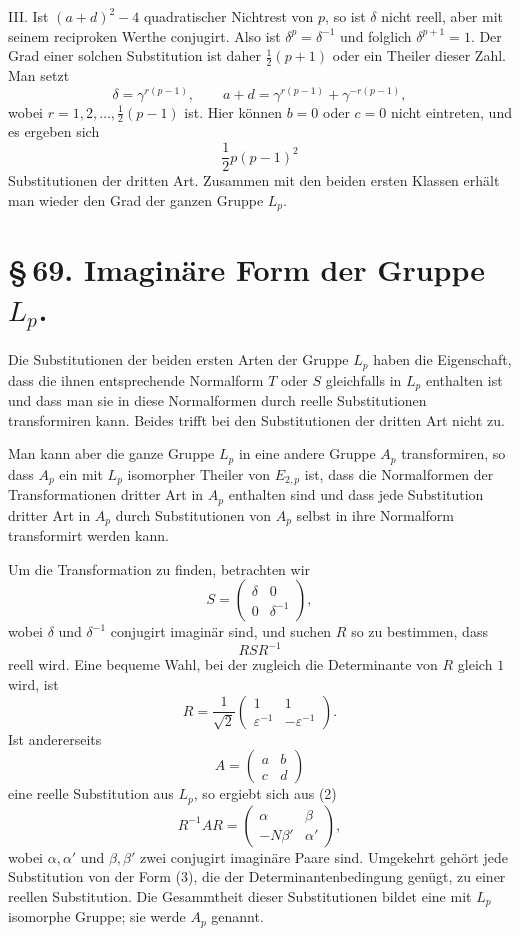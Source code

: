 \documentclass[11pt]{article}
\providecommand{\mat}[4]{\begin{pmatrix}#1&#2\\#3&#4\end{pmatrix}}
\providecommand{\mat}[4]{\begin{pmatrix}#1&#2\\#3&#4\end{pmatrix}}
\begin{document}
III. Ist $(a+d)^2-4$ quadratischer Nichtrest von $p$, so ist $\delta$ nicht reell, aber mit seinem reciproken Werthe conjugirt. Also ist $\delta^p=\delta^{-1}$ und folglich $\delta^{p+1}=1$. Der Grad einer solchen Substitution ist daher $\frac12(p+1)$ oder ein Theiler dieser Zahl. Man setzt
\begin{equation}
 \delta=\gamma^{r(p-1)},\qquad
 a+d=\gamma^{r(p-1)}+\gamma^{-r(p-1)},
 \tag{10}
\end{equation}
wobei $r=1,2,\ldots,\frac12(p-1)$ ist. Hier können $b=0$ oder $c=0$ nicht eintreten, und es ergeben sich
\[
 \frac12p(p-1)^2
\]
Substitutionen der dritten Art. Zusammen mit den beiden ersten Klassen erhält man wieder den Grad der ganzen Gruppe $L_p$.

\section*{\S\,69. Imaginäre Form der Gruppe $L_p$.}

Die Substitutionen der beiden ersten Arten der Gruppe $L_p$ haben die Eigenschaft, dass die ihnen entsprechende Normalform $T$ oder $S$ gleichfalls in $L_p$ enthalten ist und dass man sie in diese Normalformen durch reelle Substitutionen transformiren kann. Beides trifft bei den Substitutionen der dritten Art nicht zu.

Man kann aber die ganze Gruppe $L_p$ in eine andere Gruppe $A_p$ transformiren, so dass $A_p$ ein mit $L_p$ isomorpher Theiler von $E_{2,p}$ ist, dass die Normalformen der Transformationen dritter Art in $A_p$ enthalten sind und dass jede Substitution dritter Art in $A_p$ durch Substitutionen von $A_p$ selbst in ihre Normalform transformirt werden kann.

Um die Transformation zu finden, betrachten wir
\[
 S=\mat{\delta}{0}{0}{\delta^{-1}},
\]
wobei $\delta$ und $\delta^{-1}$ conjugirt imaginär sind, und suchen $R$ so zu bestimmen, dass
\begin{equation}
 RSR^{-1}
 \tag{1}
\end{equation}
reell wird. Eine bequeme Wahl, bei der zugleich die Determinante von $R$ gleich $1$ wird, ist
\begin{equation}
 R=\frac{1}{\sqrt2}\mat{1}{1}{\varepsilon^{-1}}{-\varepsilon^{-1}}.
 \tag{2}
\end{equation}
Ist andererseits
\[
 A=\mat{a}{b}{c}{d}
\]
eine reelle Substitution aus $L_p$, so ergiebt sich aus (2)
\begin{equation}
 R^{-1}AR=
 \mat{\alpha}{\beta}{-N\beta'}{\alpha'},
 \tag{3}
\end{equation}
wobei $\alpha,\alpha'$ und $\beta,\beta'$ zwei conjugirt imaginäre Paare sind. Umgekehrt gehört jede Substitution von der Form (3), die der Determinantenbedingung genügt, zu einer reellen Substitution. Die Gesammtheit dieser Substitutionen bildet eine mit $L_p$ isomorphe Gruppe; sie werde $A_p$ genannt.
\end{document}
